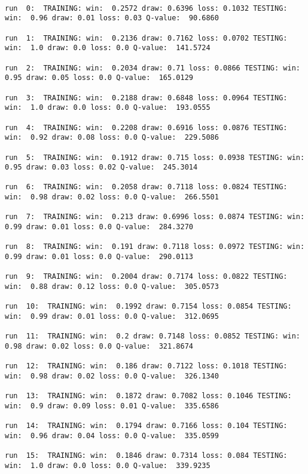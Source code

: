\documentclass[11pt]{article}
\begin{document}
    \begin{Verbatim}[commandchars=\\\{\}]

run  0:  TRAINING: win:  0.2572 draw: 0.6396 loss: 0.1032 TESTING: win:  0.96 draw: 0.01 loss: 0.03 Q-value:  90.6860

run  1:  TRAINING: win:  0.2136 draw: 0.7162 loss: 0.0702 TESTING: win:  1.0 draw: 0.0 loss: 0.0 Q-value:  141.5724

run  2:  TRAINING: win:  0.2034 draw: 0.71 loss: 0.0866 TESTING: win:  0.95 draw: 0.05 loss: 0.0 Q-value:  165.0129

run  3:  TRAINING: win:  0.2188 draw: 0.6848 loss: 0.0964 TESTING: win:  1.0 draw: 0.0 loss: 0.0 Q-value:  193.0555

run  4:  TRAINING: win:  0.2208 draw: 0.6916 loss: 0.0876 TESTING: win:  0.92 draw: 0.08 loss: 0.0 Q-value:  229.5086

run  5:  TRAINING: win:  0.1912 draw: 0.715 loss: 0.0938 TESTING: win:  0.95 draw: 0.03 loss: 0.02 Q-value:  245.3014

run  6:  TRAINING: win:  0.2058 draw: 0.7118 loss: 0.0824 TESTING: win:  0.98 draw: 0.02 loss: 0.0 Q-value:  266.5501

run  7:  TRAINING: win:  0.213 draw: 0.6996 loss: 0.0874 TESTING: win:  0.99 draw: 0.01 loss: 0.0 Q-value:  284.3270

run  8:  TRAINING: win:  0.191 draw: 0.7118 loss: 0.0972 TESTING: win:  0.99 draw: 0.01 loss: 0.0 Q-value:  290.0113

run  9:  TRAINING: win:  0.2004 draw: 0.7174 loss: 0.0822 TESTING: win:  0.88 draw: 0.12 loss: 0.0 Q-value:  305.0573

run  10:  TRAINING: win:  0.1992 draw: 0.7154 loss: 0.0854 TESTING: win:  0.99 draw: 0.01 loss: 0.0 Q-value:  312.0695

run  11:  TRAINING: win:  0.2 draw: 0.7148 loss: 0.0852 TESTING: win:  0.98 draw: 0.02 loss: 0.0 Q-value:  321.8674

run  12:  TRAINING: win:  0.186 draw: 0.7122 loss: 0.1018 TESTING: win:  0.98 draw: 0.02 loss: 0.0 Q-value:  326.1340

run  13:  TRAINING: win:  0.1872 draw: 0.7082 loss: 0.1046 TESTING: win:  0.9 draw: 0.09 loss: 0.01 Q-value:  335.6586

run  14:  TRAINING: win:  0.1794 draw: 0.7166 loss: 0.104 TESTING: win:  0.96 draw: 0.04 loss: 0.0 Q-value:  335.0599

run  15:  TRAINING: win:  0.1846 draw: 0.7314 loss: 0.084 TESTING: win:  1.0 draw: 0.0 loss: 0.0 Q-value:  339.9235


\end{Verbatim}
\end{document}
